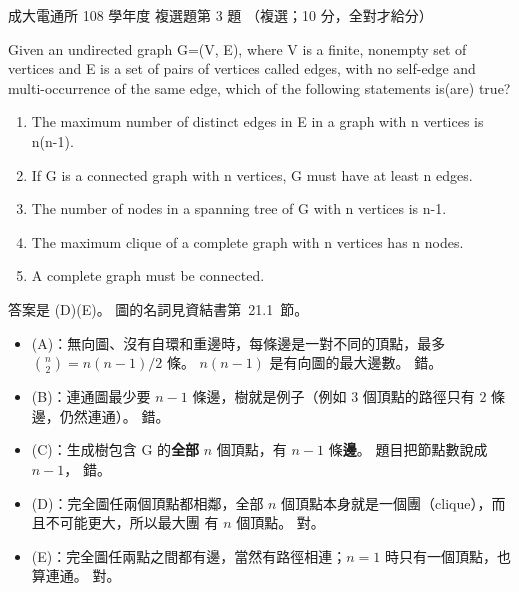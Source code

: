 \begin{pastexam}[label={px:ncku-108-comm-ds-03}]{成大電通所 108 學年度 複選題第 3 題}
（複選；10 分，全對才給分）

Given an undirected graph G=(V, E), where V is a finite, nonempty set of vertices and E is a set of pairs
of vertices called edges, with no self-edge and multi-occurrence of the same edge, which of the
following statements is(are) true?
\begin{enumerate}[label=(\Alph*)]
\item The maximum number of distinct edges in E in a graph with n vertices is n(n-1).
\item If G is a connected graph with n vertices, G must have at least n edges.
\item The number of nodes in a spanning tree of G with n vertices is n-1.
\item The maximum clique of a complete graph with n vertices has n nodes.
\item A complete graph must be connected.
\end{enumerate}
\end{pastexam}

\begin{pastsoln}
答案是 (D)(E)。 圖的名詞見資結書第~21.1~節。
\begin{itemize}
\item (A)：無向圖、沒有自環和重邊時，每條邊是一對不同的頂點，最多 $\binom{n}{2} = n(n-1)/2$ 條。
$n(n-1)$ 是有向圖的最大邊數。 錯。
\item (B)：連通圖最少要 $n - 1$ 條邊，樹就是例子（例如 $3$ 個頂點的路徑只有 $2$ 條邊，仍然連通）。 錯。
\item (C)：生成樹包含 G 的\textbf{全部} $n$ 個頂點，有 $n - 1$ 條\textbf{邊}。 題目把節點數說成 $n - 1$，
錯。
\item (D)：完全圖任兩個頂點都相鄰，全部 $n$ 個頂點本身就是一個團（clique），而且不可能更大，所以最大團
有 $n$ 個頂點。 對。
\item (E)：完全圖任兩點之間都有邊，當然有路徑相連；$n = 1$ 時只有一個頂點，也算連通。 對。
\end{itemize}
\end{pastsoln}
